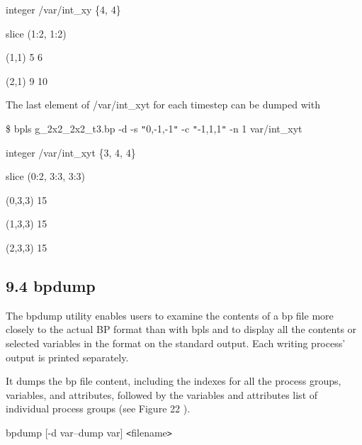 \vspace{10pt}
\parindent=7pt
integer    /var/int\_xy    \{4, 4\}

\vspace{10pt}
\parindent=14pt
slice (1:2, 1:2)

\vspace{10pt}
(1,1)    5 6 

\vspace{10pt}
(2,1)    9 10

\vspace{22pt}
\parindent=0pt
The last element of /var/int\_xyt for each timestep can be dumped with

\vspace{10pt}
\$ bpls g\_2x2\_2x2\_t3.bp -d -s \texttt{"}0,-1,-1\texttt{"} -c \texttt{"}-1,1,1\texttt{"} 
-n 1 var/int\_xyt

\vspace{10pt}
\parindent=7pt
integer    /var/int\_xyt   \{3, 4, 4\}

\vspace{10pt}
\parindent=14pt
slice (0:2, 3:3, 3:3)

\vspace{10pt}
(0,3,3)    15 

\vspace{10pt}
(1,3,3)    15 

\vspace{10pt}
(2,3,3)    15\label{HToc182553429}

\vspace{10pt}
\subsection*{{\large 9.4 }{\large \textbf{bpdump}}}

\vspace{10pt}
\parindent=0pt
The bpdump utility enables users to examine the contents of a bp file more closely 
to the actual BP format than with bpls and to display all the contents or selected 
variables in the format on the standard output. Each writing process' output is 
printed separately. 

\vspace{10pt}
\parindent=3pt
It dumps the bp file content, including the indexes for all the process groups, 
variables, and attributes, followed by the variables and attributes list of individual 
process groups (see Figure 22 ).

\vspace{22pt}
\parindent=0pt
bpdump [-d var\textbar{}--dump var] \texttt{<}filename\texttt{>}


